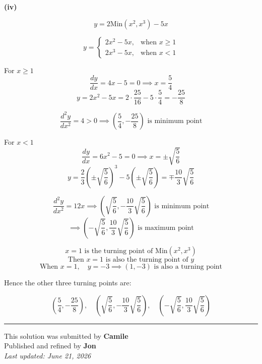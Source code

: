 \documentclass[12pt]{article}
\begin{document}
\textbf{(iv)}

$$y=2\mathrm{Min}(x^2,x^3)-5x$$

$$
y=
\begin{cases}
2x^2-5x, & \text{when }x\geq1\\
2x^3-5x, & \text{when }x<1
\end{cases}
$$

For $x\geq1$
$$\frac{dy}{dx}=4x-5=0\implies x=\frac54 $$
$$y=2x^2-5x=2\cdot\frac{25}{16}-5\cdot\frac54=-\frac{25}{8}$$

$$\frac{d^2y}{dx^2}=4>0\implies \left(\frac54,-\frac{25}{8}\right)\text{ is minimum point}$$

For $x<1$
$$\frac{dy}{dx}=6x^2-5=0\implies x=\pm\sqrt{\frac56}$$
$$y=\frac{2}{3}\left(\pm\sqrt{\frac56}\right)^3-5\left(\pm\sqrt{\frac56}\right)=\mp\frac{10}{3}\sqrt{\frac56}$$

$$\frac{d^2y}{dx^2}=12x \implies \left(\sqrt{\frac56},-\frac{10}{3}\sqrt{\frac56}\right)\text{ is minimum point}$$
$$\implies \left(-\sqrt{\frac56},\frac{10}{3}\sqrt{\frac56}\right)\text{ is maximum point}$$

$$x=1\text{ is the turning point of }\mathrm{Min}(x^2,x^3)$$
$$\text{Then }x=1\text{ is also the turning point of }y$$
$$\text{When }x=1,\quad y=-3\implies (1,-3)\text{ is also a turning point}$$

Hence the other three turning points are:

$$
\boxed{
\left(\frac54,-\frac{25}{8}\right),\quad
\left(\sqrt{\frac56},-\frac{10}{3}\sqrt{\frac56}\right),\quad
\left(-\sqrt{\frac56},\frac{10}{3}\sqrt{\frac56}\right)
}
$$

\begin{center}
\end{center}

\bigskip
\hrule
\begin{center}
    This solution was submitted by \textbf{Camile}\\[4pt]
    Published and refined by \textbf{Jon}\\[8pt]
    \textit{Last updated: June 21, 2026}
\end{center}
\end{document}
